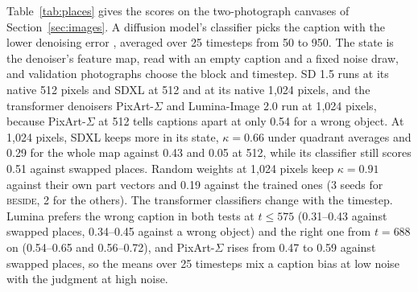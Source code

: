 Table~\ref{tab:places} gives the scores on the two-photograph canvases of Section~\ref{sec:images}. A diffusion model's classifier picks the caption with the lower denoising error \citep{li2023diffclassifier,clark2023diffclassifier}, averaged over 25 timesteps from 50 to 950. The state is the denoiser's feature map, read with an empty caption and a fixed noise draw, and validation photographs choose the block and timestep. SD 1.5 runs at its native 512 pixels and SDXL at 512 and at its native 1{,}024 pixels, and the transformer denoisers PixArt-$\Sigma$ \citep{chen2024pixartsigma} and Lumina-Image 2.0 \citep{qin2025lumina2} run at 1{,}024 pixels, because PixArt-$\Sigma$ at 512 tells captions apart at only 0.54 for a wrong object. At 1{,}024 pixels, SDXL keeps more in its state, $\kappa = 0.66$ under quadrant averages and 0.29 for the whole map against 0.43 and 0.05 at 512, while its classifier still scores 0.51 against swapped places. Random weights at 1{,}024 pixels keep $\kappa = 0.91$ against their own part vectors and 0.19 against the trained ones (3 seeds for \textsc{beside}, 2 for the others). The transformer classifiers change with the timestep. Lumina prefers the wrong caption in both tests at $t \le 575$ (0.31--0.43 against swapped places, 0.34--0.45 against a wrong object) and the right one from $t = 688$ on (0.54--0.65 and 0.56--0.72), and PixArt-$\Sigma$ rises from 0.47 to 0.59 against swapped places, so the means over 25 timesteps mix a caption bias at low noise with the judgment at high noise.

